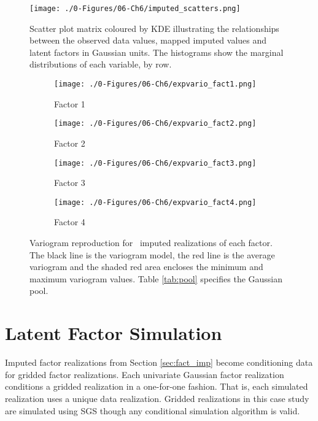\begin{figure}[htb!]
    \centering
    \texttt{[image: ./0-Figures/06-Ch6/imputed\_scatters.png]}
    \caption{Scatter plot matrix coloured by \gls{KDE} illustrating the relationships between the observed data values, mapped imputed values and latent factors in Gaussian units. The histograms show the marginal distributions of each variable, by row. }
    \label{fig:imputed_scatters}
\end{figure}

\begin{figure}
    \begin{subfigure}{1.0\textwidth}
        \centering
        \texttt{[image: ./0-Figures/06-Ch6/expvario\_fact1.png]}
        \caption{Factor 1}
    \end{subfigure}
    \begin{subfigure}{1.0\textwidth}
        \centering
        \texttt{[image: ./0-Figures/06-Ch6/expvario\_fact2.png]}
        \caption{Factor 2}
    \end{subfigure}
    \begin{subfigure}{1.0\textwidth}
        \centering
        \texttt{[image: ./0-Figures/06-Ch6/expvario\_fact3.png]}
        \caption{Factor 3}
    \end{subfigure}
    \begin{subfigure}{1.0\textwidth}
        \centering
        \texttt{[image: ./0-Figures/06-Ch6/expvario\_fact4.png]}
        \caption{Factor 4}
    \end{subfigure}
    \caption{Variogram reproduction for \csnreals \ imputed realizations of each factor. The black line is the variogram model, the red line is the average variogram and the shaded red area encloses the minimum and maximum variogram values. Table \ref{tab:pool} specifies the Gaussian pool.}
    \label{fig:nmrimp_repro_gvario}
\end{figure}


\FloatBarrier
\section{Latent Factor Simulation}
\label{sec:fact_sim}

Imputed factor realizations from Section \ref{sec:fact_imp} become conditioning data for gridded factor realizations. Each univariate Gaussian factor realization conditions a gridded realization in a one-for-one fashion. That is, each simulated realization uses a unique data realization. Gridded realizations in this case study are simulated using \gls{SGS} though any conditional simulation algorithm is valid.

